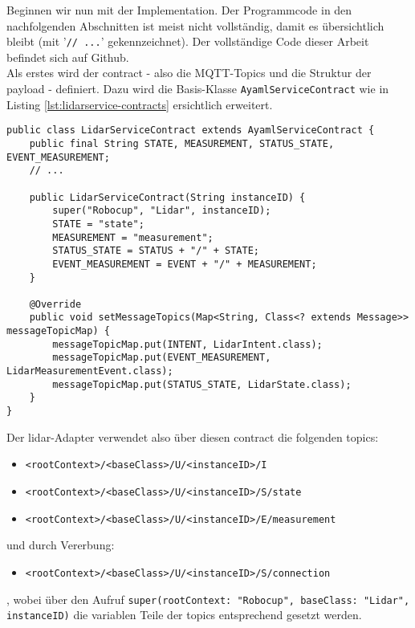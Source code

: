 Beginnen wir nun mit der Implementation. Der Programmcode in den nachfolgenden Abschnitten ist meist nicht vollständig, damit es übersichtlich bleibt (mit '\verb|// ...|' gekennzeichnet). Der vollständige Code dieser Arbeit befindet sich auf Github\cite{github-thesis}. \\
Als erstes wird der \Gls{contract} - also die MQTT-Topics und die Struktur der \Gls{payload} - definiert. Dazu wird die Basis-Klasse \verb|AyamlServiceContract| wie in Listing \ref{lst:lidarservice-contracts} ersichtlich erweitert.
\begin{lstlisting}[caption={Lidar-Adapter - Contracts},label={lst:lidarservice-contracts}]
public class LidarServiceContract extends AyamlServiceContract {
    public final String STATE, MEASUREMENT, STATUS_STATE, EVENT_MEASUREMENT;
    // ...

    public LidarServiceContract(String instanceID) {
        super("Robocup", "Lidar", instanceID);
        STATE = "state";
        MEASUREMENT = "measurement";
        STATUS_STATE = STATUS + "/" + STATE;
        EVENT_MEASUREMENT = EVENT + "/" + MEASUREMENT;
    }

    @Override
    public void setMessageTopics(Map<String, Class<? extends Message>> messageTopicMap) {
        messageTopicMap.put(INTENT, LidarIntent.class);
        messageTopicMap.put(EVENT_MEASUREMENT, LidarMeasurementEvent.class);
        messageTopicMap.put(STATUS_STATE, LidarState.class);
    }
}
\end{lstlisting}
Der \acrshort{lidar}-Adapter verwendet also über diesen \Gls{contract} die folgenden \Glspl{topic}:
\begin{itemize}
	\item \verb|<rootContext>/<baseClass>/U/<instanceID>/I|
	\item \verb|<rootContext>/<baseClass>/U/<instanceID>/S/state|
	\item \verb|<rootContext>/<baseClass>/U/<instanceID>/E/measurement|
\end{itemize}
und durch Vererbung:
\begin{itemize}
	\item \verb|<rootContext>/<baseClass>/U/<instanceID>/S/connection|
\end{itemize}
, wobei über den Aufruf \verb|super(rootContext: "Robocup", baseClass: "Lidar", instanceID)| die variablen Teile der \Glspl{topic} entsprechend gesetzt werden.

